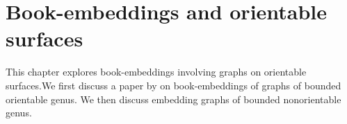 \chapter{Book-embeddings and orientable surfaces}

This chapter explores book-embeddings involving graphs on orientable surfaces.We first discuss a paper by \textcite{heathPagenumberGenusGraphs1992} on book-embeddings of graphs of bounded orientable genus. We then discuss embedding graphs of bounded nonorientable genus. 





